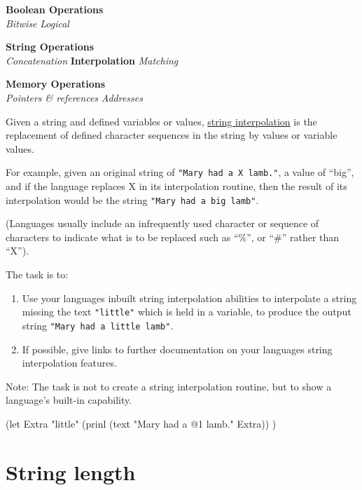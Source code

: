 \textbf{Boolean Operations} \\ \emph{Bitwise}
\textbar{} \emph{Logical}

\textbf{String Operations} \\
\emph{Concatenation} \textbar{}
\textbf{Interpolation} \textbar{}
\emph{Matching}

\textbf{Memory Operations} \\
\emph{Pointers \& references}
\textbar{} \emph{Addresses}

Given a string and defined variables or values,
\href{http://en.wikipedia.org/wiki/String\_literal\#Variable\_interpolation}{string
interpolation} is the replacement of defined character sequences in the
string by values or variable values.

For example, given an original string of \texttt{"Mary had a X lamb."},
a value of ``big'', and if the language replaces X in its interpolation
routine, then the result of its interpolation would be the string
\texttt{"Mary had a big lamb"}.

(Languages usually include an infrequently used character or sequence of
characters to indicate what is to be replaced such as ``\%'', or ``\#''
rather than ``X'').

The task is to:

\begin{enumerate}
\item
  Use your languages inbuilt string interpolation abilities to
  interpolate a string missing the text \texttt{"little"} which is held
  in a variable, to produce the output string
  \texttt{"Mary had a little lamb"}.
\item
  If possible, give links to further documentation on your languages
  string interpolation features.
\end{enumerate}

Note: The task is not to create a string interpolation routine, but to
show a language's built-in capability.



\begin{wideverbatim}

(let Extra "little"
   (prinl (text "Mary had a @1 lamb." Extra)) )

\end{wideverbatim}

\pagebreak{}
\section*{String length}

